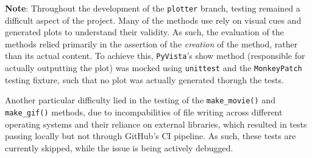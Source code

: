 \textbf{Note}: Throughout the development of the \texttt{plotter} branch, testing remained a difficult aspect of the project. Many of the methods use rely on visual cues and generated plots to understand their validity. As such, the evaluation of the methods relied primarily in the assertion of the \textit{creation} of the method, rather than its actual content. To achieve this, \texttt{PyVista}'s show method (responsible for actually outputting the plot) was mocked using \texttt{unittest} and the \texttt{MonkeyPatch} testing fixture, such that no plot was actually generated thorugh the tests.

Another particular difficulty lied in the testing of the \texttt{make\_movie()} and \texttt{make\_gif()} methods, due to incompabilities of file writing across different operating systems and their reliance on external libraries, which resulted in tests passing locally but not through GitHub's CI pipeline. As such, these tests are currently skipped, while the issue is being actively debugged.

